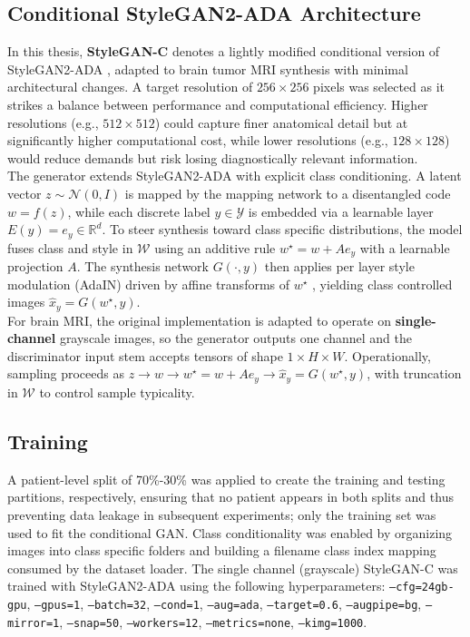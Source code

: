 \subsection{Conditional StyleGAN2-ADA Architecture}
\label{subsec:stylegan_arch}
In this thesis, \textbf{StyleGAN-C} denotes a lightly modified conditional version of StyleGAN2-ADA \cite{Karras2019stylegan2}, adapted to brain tumor MRI synthesis with minimal architectural changes. A target resolution of $256\times256$ pixels was selected as it strikes a balance between performance and computational efficiency. Higher resolutions (e.g., $512\times512$) could capture finer anatomical detail but at significantly higher computational cost, while lower resolutions (e.g., $128\times128$) would reduce demands but risk losing diagnostically relevant information. \\

The generator extends StyleGAN2-ADA with explicit class conditioning. A latent vector \(z \sim \mathcal{N}(0, I)\) is mapped by the mapping network to a disentangled code \(w = f(z)\), while each discrete label \(y \in \mathcal{Y}\) is embedded via a learnable layer \(E(y) = e_y \in \mathbb{R}^d\). To steer synthesis toward class specific distributions, the model fuses class and style in \(\mathcal{W}\) using an additive rule \(w^\star = w + A e_y\) with a learnable projection \(A\). The synthesis network \(G(\cdot, y)\) then applies per layer style modulation (AdaIN) driven by affine transforms of \(w^\star\) , yielding class controlled images \(\hat{x}_y = G(w^\star, y)\). 
\\

For brain MRI, the original implementation is adapted to operate on \textbf{single-channel} grayscale images, so the generator outputs one channel and the discriminator input stem accepts tensors of shape \(1 \times H \times W\). Operationally, sampling proceeds as
\(z \rightarrow w \rightarrow w^\star = w + A e_y \rightarrow \hat{x}_y = G(w^\star, y)\), with truncation in \(\mathcal{W}\) to control sample typicality.


\subsection{Training}

A patient-level split of 70\%-30\% was applied to create the training and testing partitions, respectively, ensuring that no patient appears in both splits and thus preventing data leakage in subsequent experiments; only the training set was used to fit the conditional GAN. Class conditionality was enabled by organizing images into class specific folders and building a filename class index mapping consumed by the dataset loader. The single channel (grayscale) StyleGAN-C was trained with StyleGAN2-ADA using the following hyperparameters: \texttt{\string--cfg=24gb-gpu}, \texttt{\string--gpus=1}, \texttt{\string--batch=32}, \texttt{\string--cond=1}, \texttt{\string--aug=ada}, \texttt{\string--target=0.6}, \texttt{\string--augpipe=bg}, \texttt{\string--mirror=1}, \texttt{\string--snap=50}, \texttt{\string--workers=12}, \texttt{\string--metrics=none}, \texttt{\string--kimg=1000}.


